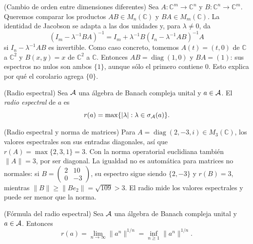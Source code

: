\begin{cthejemplo}{(Cambio de orden entre dimensiones diferentes)}
Sea $A:\mathbb C^m\to\mathbb C^n$ y
$B:\mathbb C^n\to\mathbb C^m$. Queremos comparar los productos
$AB\in M_n(\mathbb C)$ y $BA\in M_m(\mathbb C)$.
La identidad de Jacobson se adapta a las dos unidades y, para
$\lambda\ne0$, da
\[
 (I_m-\lambda^{-1}BA)^{-1}
 =I_m+\lambda^{-1}B(I_n-\lambda^{-1}AB)^{-1}A
\]
 si $I_n-\lambda^{-1}AB$ es invertible. Como caso concreto, tomemos
$A(t)=(t,0)$ de $\mathbb C$ a $\mathbb C^2$ y
$B(x,y)=x$ de $\mathbb C^2$ a $\mathbb C$. Entonces
$AB=\operatorname{diag}(1,0)$ y $BA=(1)$:
sus espectros no nulos son ambos $\{1\}$, aunque sólo el primero
contiene $0$. Esto explica por qué el corolario agrega $\{0\}$.
\end{cthejemplo}

\begin{cthdefinicion}{(Radio espectral)}
Sea $\mathcal A$ una álgebra de Banach compleja unital y $a\in\mathcal A$.
El \emph{radio espectral} de $a$ es
\[
 r(a)=\max\{|\lambda|:\lambda\in\sigma_\mathcal A(a)\}.
\]
\end{cthdefinicion}

\begin{cthejemplo}{(Radio espectral y norma de matrices)}
Para $A=\operatorname{diag}(2,-3,i)\in M_3(\mathbb C)$,
los valores espectrales son sus entradas diagonales, así que
$r(A)=\max\{2,3,1\}=3$. Con la norma operatorial euclidiana también
$\|A\|=3$, por ser diagonal. La igualdad no es automática para matrices
no normales: si
$B=\begin{pmatrix}2&10\\0&-3\end{pmatrix}$,
su espectro sigue siendo $\{2,-3\}$ y $r(B)=3$, mientras
$\|B\|\ge\|Be_2\|=\sqrt{109}>3$.
El radio mide los valores espectrales y puede ser menor que la norma.
\end{cthejemplo}

\begin{cthteorema}{(Fórmula del radio espectral)}
Sea $\mathcal A$ una álgebra de Banach compleja unital y $a\in\mathcal A$.
Entonces
\[
 r(a)=\lim_{n\to\infty}\|a^n\|^{1/n}
     =\inf_{n\ge1}\|a^n\|^{1/n}.
\]
\end{cthteorema}

